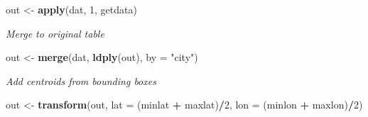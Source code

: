 \documentclass[3p]{elsarticle} %
\newenvironment{Shaded}{\begin{snugshade}}{\end{snugshade}}
\newcommand{\ControlFlowTok}[1]{\textcolor[rgb]{0.13,0.29,0.53}{\textbf{#1}}}
\newcommand{\DataTypeTok}[1]{\textcolor[rgb]{0.13,0.29,0.53}{#1}}
\newcommand{\DecValTok}[1]{\textcolor[rgb]{0.00,0.00,0.81}{#1}}
\newcommand{\KeywordTok}[1]{\textcolor[rgb]{0.13,0.29,0.53}{\textbf{#1}}}
\newcommand{\NormalTok}[1]{#1}
\newcommand{\OperatorTok}[1]{\textcolor[rgb]{0.81,0.36,0.00}{\textbf{#1}}}
\newcommand{\OtherTok}[1]{\textcolor[rgb]{0.56,0.35,0.01}{#1}}
\newcommand{\StringTok}[1]{\textcolor[rgb]{0.31,0.60,0.02}{#1}}
\begin{document}
\begin{Shaded}
\end{Shaded}

\begin{Shaded}
\begin{Highlighting}[]
\NormalTok{out <{-}}\StringTok{ }\KeywordTok{apply}\NormalTok{(dat, }\DecValTok{1}\NormalTok{, getdata)}
\end{Highlighting}
\end{Shaded}

\emph{Merge to original table}

\begin{Shaded}
\begin{Highlighting}[]
\NormalTok{out <{-}}\StringTok{ }\KeywordTok{merge}\NormalTok{(dat, }\KeywordTok{ldply}\NormalTok{(out), }\DataTypeTok{by =} \StringTok{"city"}\NormalTok{)}
\end{Highlighting}
\end{Shaded}

\emph{Add centroids from bounding boxes}

\begin{Shaded}
\begin{Highlighting}[]
\NormalTok{out <{-}}\StringTok{ }\KeywordTok{transform}\NormalTok{(out, }\DataTypeTok{lat =}\NormalTok{ (minlat }\OperatorTok{+}\StringTok{ }\NormalTok{maxlat)}\OperatorTok{/}\DecValTok{2}\NormalTok{, }\DataTypeTok{lon =}\NormalTok{ (minlon }\OperatorTok{+}\StringTok{ }\NormalTok{maxlon)}\OperatorTok{/}\DecValTok{2}\NormalTok{)}
\end{Highlighting}
\end{Shaded}
\end{document}
